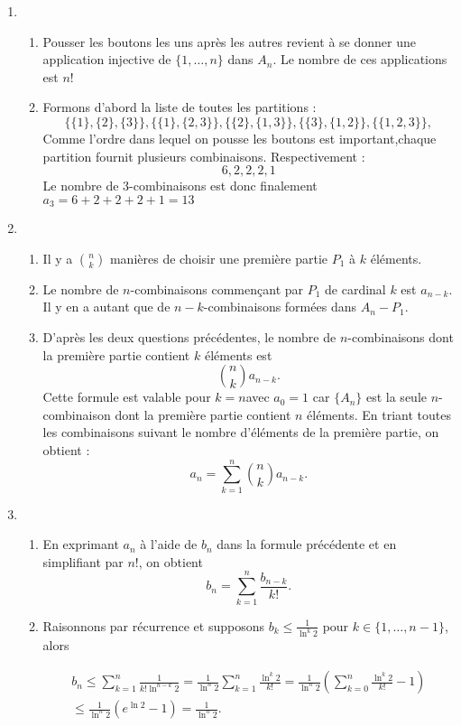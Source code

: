 \begin{enumerate}
\item
\begin{enumerate}
\item Pousser les boutons les uns apr{\`e}s les autres revient {\`a} se donner une application injective de $\{1,\ldots,n\}$ dans $A_n$. Le nombre de ces applications est $n !$
\item Formons d'abord la liste de toutes les partitions :
\[\{\{1\},\{2\},\{3\}\},\{\{1\},\{2,3\}\},\{\{2\},\{1,3\}\},\{\{3\},\{1,2\}\},\{\{1,2,3\}\},\]
Comme l'ordre dans lequel on pousse les boutons est important,chaque partition fournit plusieurs combinaisons. Respectivement :
\[6,2,2,2,1\]
Le nombre de 3-combinaisons est donc finalement $a_3=6+2+2+2+1=13$
\end{enumerate}
\item \begin{enumerate}
\item Il y a $\binom{n}{k}$ mani{\`e}res de choisir une premi{\`e}re partie $P_1$ {\`a} $k$ {\'e}l{\'e}ments.
\item Le nombre de $n$-combinaisons commen\c{c}ant par $P_1$ de cardinal $k$ est $a_{n-k}$. Il y en a autant que de $n-k$-combinaisons form{\'e}es dans $A_n-P_1$.
\item D'apr{\`e}s les deux questions pr{\'e}c{\'e}dentes, le nombre de $n$-combinaisons dont la premi{\`e}re partie contient $k$ {\'e}l{\'e}ments est $$\binom{n}{k}a_{n-k}.$$
Cette formule est valable pour $k=n$avec $a_0=1$ car $\{A_n\}$ est la seule $n$-combinaison dont la premi{\`e}re partie contient $n$ {\'e}l{\'e}ments.\newline
En triant toutes les combinaisons suivant le nombre d'{\'e}l{\'e}ments de la premi{\`e}re partie, on obtient :
\[
  a_n=\sum _{k=1}^{n} \binom{n}{k}a_{n-k}.
\]
\end{enumerate}
\item \begin{enumerate}
\item En exprimant $a_n$ {\`a} l'aide de $b_n$ dans la formule pr{\'e}c{\'e}dente et en simplifiant par $n !$, on obtient
\[ 
  b_n=\sum _{k=1}^{n} \frac{ b_{n-k}}{k !} .
\]
\item Raisonnons par r{\'e}currence et supposons $b_k\leq \frac{1}{\ln^{k}2}$ pour $k\in \{1,\ldots,n-1\}$, alors

\begin{multline*}
b_n \leq \sum _{k=1}^{n}\frac{1}{k !\ln^{n-k}2} = \frac{1}{\ln^{n}2}\sum _{k=1}^{n} \frac{\ln^{k}2}{k !} 
 = \frac{1}{\ln^{n}2}\left ( \sum _{k=0}^{n}\frac{\ln^{k}2}{k !}-1 \right ) \\
 \leq  \frac{1}{\ln^{n}2}\left ( e^{\ln 2 } - 1\right )= \frac{1}{\ln^{n}2}.
\end{multline*}
\end{enumerate}

\end{enumerate}
